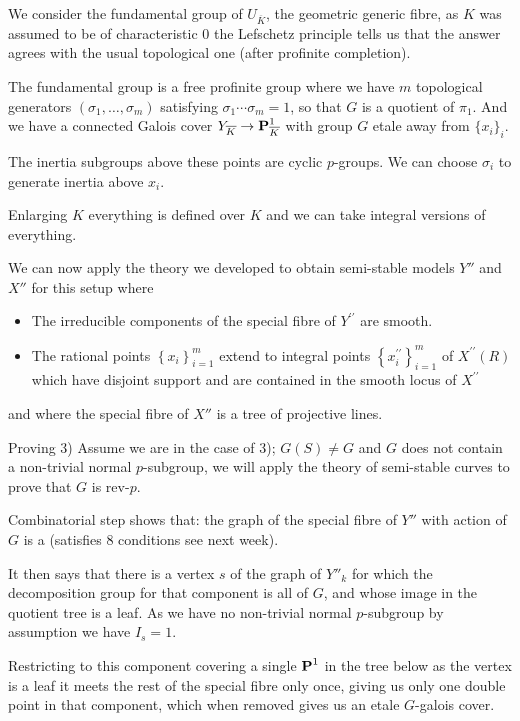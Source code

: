 \begin{frame}
    We consider the fundamental group of $U_{\overline K}$, the geometric generic fibre, as $K$ was assumed to be of characteristic $0$ the Lefschetz principle tells us that the answer agrees with the usual topological one (after profinite completion).

    The fundamental group is a free profinite group where we have $m$ topological generators  $(\sigma _1, \ldots, \sigma _m)$ satisfying $\sigma _1 \cdots \sigma _m = 1$, so that $G$ is a quotient of $\pi _1$. And we have a connected Galois cover $Y_{\overline K} \to \operatorname{\mathbf {P}}^1_{\overline K} $ with group $G$ etale away from $\{x_i\}_{i}$.

    The inertia subgroups above these points are cyclic $p$-groups.
    We can choose $\sigma _i$ to generate inertia above $x_i$.

    Enlarging $K$ everything is defined over $K$ and we can take integral versions of everything.
\end{frame}

\begin{frame}
    We can now apply the theory we developed to obtain semi-stable models $Y''$ and $X''$ for this setup where
    \begin{itemize}
        \item The irreducible components of the special fibre of $Y^{\prime \prime}$ are smooth.
        \item The rational points $\left\{x_{i}\right\}_{i=1}^{m}$ extend to integral points $\left\{x_{i}^{\prime \prime}\right\}_{i=1}^{m}$ of $X^{\prime \prime}(R)$ which have disjoint support and are contained in the smooth locus of $X^{\prime \prime}$
    \end{itemize}

    and where the special fibre of $X''$ is a tree of projective lines.
\end{frame}



\begin{frame}{Proving 3)}
    Assume we are in the case of 3); $G(S) \ne G$ and $G$ does not contain a non-trivial normal $p$-subgroup, we will apply the theory of semi-stable curves to prove that $G$ is rev-$p$.

    Combinatorial step shows that: the graph of the special fibre of $Y''$ with action of $G$ is a  (satisfies 8 conditions see next week).

    It then says that there is a vertex $s$ of the graph of $Y''_k$ for which the decomposition group for that component is all of $G$, and whose image in the quotient tree is a leaf.
    As we have no non-trivial normal $p$-subgroup by assumption we have $I_s = 1$.

    Restricting to this component covering a single $\operatorname{\mathbf {P}}^1$ in the tree below as the vertex is a leaf it meets the rest of the special fibre only once, giving us only one double point in that component, which when removed gives us an etale $G$-galois cover.
\end{frame}

